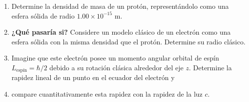 \item \begin{enumerate}
    \item Determine la densidad de masa de un protón, representándolo como una esfera sólida de radio $1.00 \times 10^{-15}\text{ m}$.
    \item \textbf{¿Qué pasaría si?} Considere un modelo clásico de un electrón como una esfera sólida con la misma densidad que el protón. Determine su radio clásico.
    \item Imagine que este electrón posee un momento angular orbital de espín $L_{\text{espín}} = \hbar/2$ debido a su rotación clásica alrededor del eje $z$. Determine la rapidez lineal de un punto en el ecuador del electrón y
    \item compare cuantitativamente esta rapidez con la rapidez de la luz $c$.
\end{enumerate}